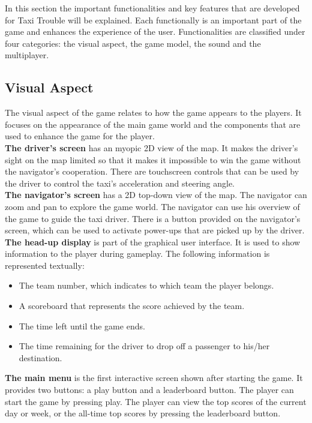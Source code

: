 In this section the important functionalities and key features that are developed for Taxi Trouble  will be explained. Each functionally is an important part of the game and enhances the experience of the user. Functionalities are classified under four categories: the visual aspect, the game model, the sound and the multiplayer. 

\subsection*{Visual Aspect} %
\label{sub:visual_aspect}
The visual aspect of the game relates to how the game appears to the players. It focuses on the appearance of the main game world and the components that are used to enhance the game for the player. \\

\textbf{The driver's screen }has an myopic 2D view of the map. It makes the driver's sight on the map limited so that it makes it impossible to win the game without the navigator's cooperation. There are touchscreen controls that can be used by the driver to control the taxi's acceleration and steering angle.\\   

\textbf{The navigator's screen }has a 2D top-down view of the map. The navigator can zoom and pan to explore the game world.  The navigator can use his overview of the game to guide the taxi driver. There is a button provided on the navigator's screen, which can be used to activate power-ups that are picked up by the driver.\\

\textbf{The head-up display }is part of the graphical user interface. It is used to show information to the player during gameplay.  The following information is represented textually:
			\begin{itemize}
				\item The team number, which indicates to which team the player belongs. 
				\item A scoreboard that represents the score achieved by the team. 
				\item The time left until the game ends.  
				\item The time remaining for the driver to drop  off a passenger to his/her destination. 
			\end{itemize}	

\textbf{The main menu }is the first interactive screen shown after starting the game. It provides two buttons: a play button and a leaderboard button. The player can start the game by pressing play. The player can view the top scores of the current day or week, or the all-time top scores by pressing the leaderboard button.\\

